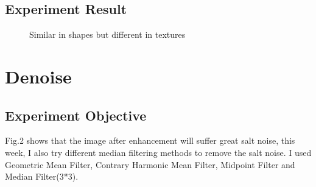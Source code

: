 \documentclass{article}
\begin{document}
\subsection{Experiment Result}
\begin{figure}[!ht] 
  \centering 
  \hspace{0.3in} 
   \hspace{0.3in} 
   \hspace{0.3in} 
   \hspace{0.3in} 
  \caption{Similar in shapes but different in textures} 
  \label{fig:subfig} %
\end{figure}



\section{Denoise}
\subsection{Experiment Objective}
Fig.2 shows that the image after enhancement will suffer great salt noise,  this week, I also try different median filtering methods to remove the salt noise. I used Geometric Mean Filter, Contrary Harmonic Mean Filter, Midpoint Filter and Median Filter(3*3). 
\end{document}

